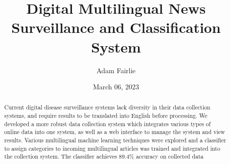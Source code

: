 \documentclass{l4proj}
\begin{document}
\title{Digital Multilingual News Surveillance and Classification System}
\author{Adam Fairlie}
\date{March 06, 2023}

\maketitle

\begin{abstract}
    Current digital disease surveillance systems lack diversity in their data collection systems, and require results to be translated into English before processing. We developed a more robust data collection system which integrates various types of online data into one system, as well as a web interface to manage the system and view results. Various multilingual machine learning techniques were explored and a classifier to assign categories to incoming multilingual articles was trained and integrated into the collection system. The classifier achieves 89.4\% accuracy on collected data
\end{abstract}


%
%
%
\educationalconsent


\tableofcontents
\end{document}
